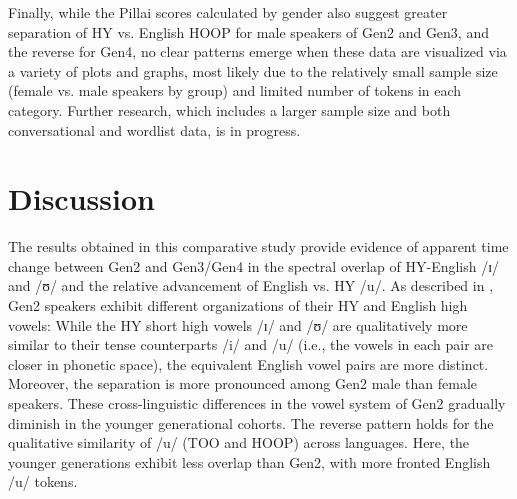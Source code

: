 \documentclass[output=paper]{langsci/langscibook}
\begin{document}
Finally, while the Pillai scores calculated by gender also suggest greater separation of HY vs. English HOOP for male speakers of Gen2 and Gen3, and the reverse for Gen4, no clear patterns emerge when these data are visualized via a variety of plots and graphs, most likely due to the relatively small sample size (female vs. male speakers by group) and limited number of tokens in each category. Further research, which includes a larger sample size and both conversational and wordlist data, is in progress. 


\section{Discussion} 
\label{sec:nove:5}

The results obtained in this comparative study provide evidence of apparent time change between Gen2 and Gen3/Gen4 in the spectral overlap of HY-English /ɪ/ and /ʊ/ and the relative advancement of English vs. HY /u/. As described in , Gen2 speakers exhibit different organizations of their HY and English high vowels: While the HY short high vowels /ɪ/ and /ʊ/ are qualitatively more similar to their tense counterparts /i/ and /u/ (i.e., the vowels in each pair are closer in phonetic space), the equivalent English vowel pairs are more distinct. Moreover, the separation is more pronounced among Gen2 male than female speakers. These cross-linguistic differences in the vowel system of Gen2 gradually diminish in the younger generational cohorts. The reverse pattern holds for the qualitative similarity of /u/ (TOO and HOOP) across languages. Here, the younger generations exhibit less overlap than Gen2, with more fronted English /u/ tokens.
\end{document}
